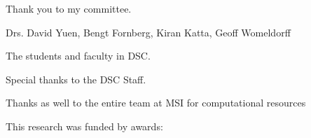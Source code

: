 \begin{acknowledgements}

Thank you to my committee. 

Drs. David Yuen, Bengt Fornberg, Kiran Katta, Geoff Womeldorff

The students and faculty in DSC. 

Special thanks to the DSC Staff. 

Thanks as well to the entire team at MSI for computational resources 

This research was funded by awards: 




\end{acknowledgements}
